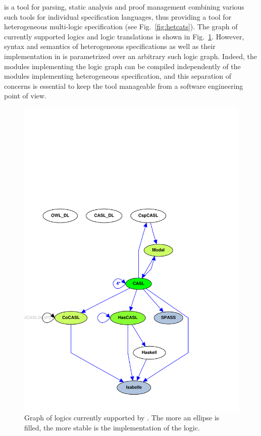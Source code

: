 {\hets} is a tool for parsing, static analysis and proof management combining various such
tools for individual specification languages, thus providing a tool for heterogeneous
multi-logic specification (see Fig.~\ref{fig:hetcats}). The graph of currently supported
logics and logic translations is shown in Fig.~\ref{fig:LogicGraph}. However, syntax and
semantics of heterogeneous specifications as well as their implementation in {\hets} is
parametrized over an arbitrary such logic graph. Indeed, the {\hets} modules implementing
the logic graph can be compiled independently of the {\hets} modules implementing
heterogeneous specification, and this separation of concerns is essential to keep the tool
manageable from a software engineering point of view.

\begin{figure}
  \begin{center}
    \includegraphics[scale=0.4]{projects/hets/LogicGraph}
  \end{center}
  \caption{Graph of logics currently supported by {\hets}. The more an ellipse is filled,
    the more stable is the implementation of the logic.}
  \label{fig:LogicGraph}
\end{figure}


